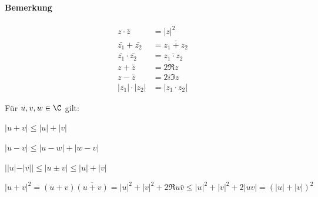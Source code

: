 \paragraph{Bemerkung}
\begin{align*}
	z\cdot \bar{z} &= |z|^2\\
	\bar{z_1}+\bar{z_2}&=\overline{z_1+z_2}\\
	\bar{z_1}\cdot \bar{z_2}&=\overline{z_1\cdot z_2}\\
	z+\bar{z}&=2\Re{z}\\
	z-\bar{z}&=2i\Im{z}\\
	|z_1|\cdot |z_2|&=|z_1 \cdot z_2|
\end{align*}
\begin{theorem}[Dreiecksungleichung]
	Für $u,v,w \in \C$ gilt:
		\begin{enumerateroman}
			\item $|u+v|\leq |u|+|v|$
			\item $|u-v|\leq |u-w|+|w-v|$
			\item $||u|-|v||\leq |u\pm v| \leq |u|+|v|$
		\end{enumerateroman}
\end{theorem}
\prove
\begin{enumerateroman}
	\item $|u+v|^2=(u+v)\overline{(u+v)}=|u|^2+|v|^2+2\Re{u\bar{v}}\leq |u|^2+|v|^2+2|uv|=(|u|+|v|)^2$
\end{enumerateroman}

